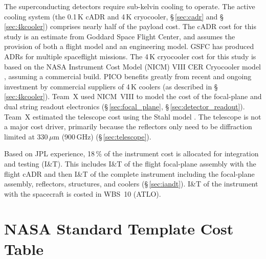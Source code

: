 The superconducting detectors require sub-kelvin cooling to
operate. The active cooling system (the 0.1\,K cADR and 4\,K
cryocooler, \S\,\ref{sec:cadr} and \S\,\ref{sec:4kcooler}) comprises nearly half of the payload
cost. The cADR cost for this study is an estimate from Goddard
Space Flight Center, and assumes the provision of both a flight
model and an engineering model. GSFC has produced ADRs for multiple
spaceflight missions. The 4\,K cryocooler cost for this study is based
on the NASA Instrument Cost Model (NICM) VIII CER Cryocooler model
\cite{Mrozinski2017}, assuming a commercial build. PICO benefits
greatly from recent and ongoing investment by commercial suppliers of
4\,K coolers (as described in \S\,\ref{sec:4kcooler}).  Team~X used NICM~VIII to model
the cost of the focal-plane and dual string readout electronics (\S\,\ref{sec:focal_plane},
\S\,\ref{sec:detector_readout}).  Team~X estimated the telescope cost using the Stahl model
\cite{Stahl2016}. The telescope is not a major cost driver, primarily
because the reflectors only need to be diffraction limited at 330\,$\mu$m
(900\,GHz) (\S\,\ref{sec:telescope}).

Based on JPL experience, 18\,\% of the instrument cost is allocated for integration and testing (I\&T). This includes I\&T of the flight focal-plane assembly with the flight cADR and then I\&T of the complete instrument including the focal-plane assembly, reflectors, structures, and coolers (\S\,\ref{sec:iandt}). I\&T of the instrument with the spacecraft is costed in WBS~10 (ATLO).

\newpage


\section*{NASA Standard Template Cost Table}

